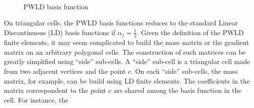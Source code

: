 \begin{figure}[H]
\centering
{}
\\
\caption{PWLD basis function}
\label{pwld}
\end{figure}
On triangular cells, the PWLD basis functions reduces to the standard Linear
Discontinuous (LD) basis functions if $\alpha_j = \frac{1}{3}$. Given the 
definition of the PWLD finite elements, it may seem complicated to build the 
mass matrix or the gradient matrix on an arbitrary polygonal cells. The 
construction of such matrices can be greatly simplified using ``side'' sub-cells. 
A ``side'' sub-cell is a triangular cell made from two adjacent vertices and the 
point $c$. On each ``side'' sub-cells, the mass matrix, for example, can be build
using LD finite elements. The coefficients in the matrix correspondent to the 
point $c$ are shared among the basis function in the cell. For instance, the
